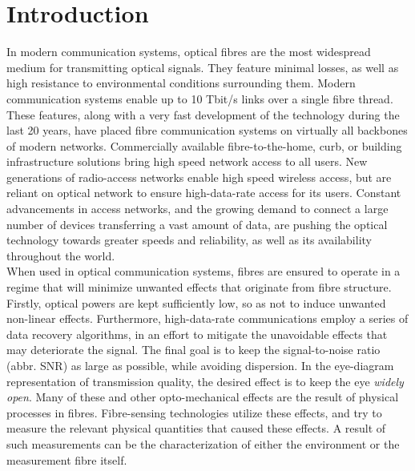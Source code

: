 \documentclass{standalone}
\begin{document}
\chapter{Introduction}
\setcounter{page}\thestranica


In modern communication systems, optical fibres are the most widespread medium for transmitting optical signals. They feature minimal losses, as well as high resistance to environmental conditions surrounding them. Modern communication systems enable up to 10 Tbit/s links over a single fibre thread. These features, along with a very fast development of the technology during the last 20 years, have placed fibre communication systems on virtually all backbones of modern networks. Commercially available fibre-to-the-home, curb, or building infrastructure solutions bring high speed network access to all users. New generations of radio-access networks enable high speed wireless access, but are reliant on optical network to ensure high-data-rate access for its users. Constant advancements in access networks, and the growing demand to connect a large number of devices transferring a vast amount of data, are pushing the optical technology towards greater speeds and reliability, as well as its availability throughout the world. \\

When used in optical communication systems, fibres are ensured to operate in a regime that will minimize unwanted effects that originate from fibre structure. Firstly, optical powers are kept sufficiently low, so as not to induce unwanted non-linear effects. Furthermore, high-data-rate communications employ a series of data recovery algorithms, in an effort to mitigate the unavoidable effects that may deteriorate the signal. The final goal is to keep the signal-to-noise ratio (abbr. SNR) as large as possible, while avoiding dispersion. In the eye-diagram representation of transmission quality, the desired effect is to keep the eye \textit{widely open}. Many of these and other opto-mechanical effects are the result of physical processes in fibres. Fibre-sensing technologies utilize these effects, and try to measure the relevant physical quantities that caused these effects. A result of such measurements can be the characterization of either the environment or the measurement fibre itself. \\
\end{document}
